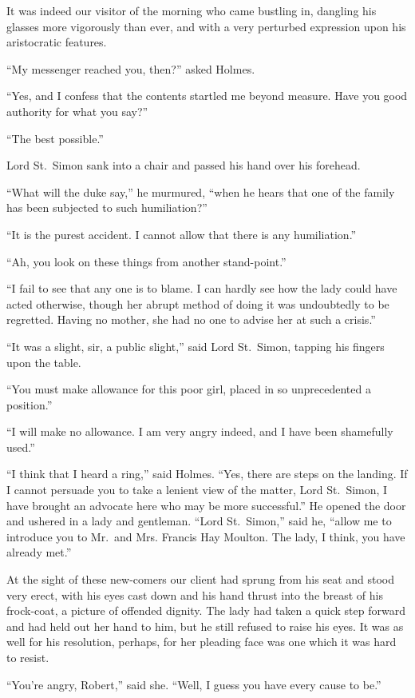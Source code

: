 It was indeed our visitor of the morning who came bustling
in, dangling his glasses more vigorously than ever, and with a
very perturbed expression upon his aristocratic features.

“My messenger reached you, then?” asked Holmes.

“Yes, and I confess that the contents startled me beyond
measure. Have you good authority for what you say?”

“The best possible.”

Lord St.~Simon sank into a chair and passed his hand over
his forehead.

“What will the duke say,” he murmured, “when he hears
that one of the family has been subjected to such
humiliation?”

“It is the purest accident. I cannot allow that there is any
humiliation.”

“Ah, you look on these things from another stand-point.”

“I fail to see that any one is to blame. I can hardly see
how the lady could have acted otherwise, though her abrupt
method of doing it was undoubtedly to be regretted. Having
no mother, she had no one to advise her at such a crisis.”

“It was a slight, sir, a public slight,” said Lord St.~Simon,
tapping his fingers upon the table.

“You must make allowance for this poor girl, placed in so
unprecedented a position.”

“I will make no allowance. I am very angry indeed, and I
have been shamefully used.”

“I think that I heard a ring,” said Holmes. “Yes, there
are steps on the landing. If I cannot persuade you to take a
lenient view of the matter, Lord St.~Simon, I have brought an
advocate here who may be more successful.” He opened the
door and ushered in a lady and gentleman. “Lord St.~Simon,”
said he, “allow me to introduce you to Mr.~and Mrs.
Francis Hay Moulton. The lady, I think, you have already
met.”

At the sight of these new-comers our client had sprung
from his seat and stood very erect, with his eyes cast down
and his hand thrust into the breast of his frock-coat, a picture
of offended dignity. The lady had taken a quick step forward
and had held out her hand to him, but he still refused to
raise his eyes. It was as well for his resolution, perhaps, for
her pleading face was one which it was hard to resist.

“You’re angry, Robert,” said she. “Well, I guess you
have every cause to be.”

